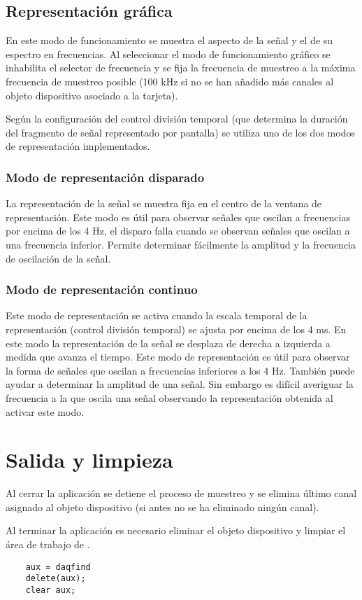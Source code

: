 \subsection{Representación gráfica}

En este modo de funcionamiento se muestra el aspecto de la señal y el de su
espectro en frecuencias. Al seleccionar el modo de funcionamiento gráfico
se inhabilita el selector de frecuencia y se fija la frecuencia de muestreo
a la máxima frecuencia de muestreo posible (100 kHz si no se han añadido
más canales al objeto dispositivo asociado a la tarjeta).

Según la configuración del control división temporal (que determina la
duración del fragmento de señal representado por pantalla) se utiliza uno
de los dos modos de representación implementados.


\subsubsection{Modo de representación disparado}

La representación de la señal se muestra fija en el centro de la ventana de
representación. Este modo es útil para observar señales que oscilan a
frecuencias por encima de los 4 Hz, el disparo falla cuando se observan
señales que oscilan a una frecuencia inferior. Permite determinar
fácilmente la amplitud y la frecuencia de oscilación de la señal.


\subsubsection{Modo de representación continuo}

Este modo de representación se activa cuando la escala temporal de la
representación (control división temporal) se ajusta por encima de los 4
ms. En este modo la representación de la señal se desplaza de derecha a
izquierda a medida que avanza el tiempo. Este modo de representación es
útil para observar la forma de señales que oscilan a frecuencias inferiores
a los 4 Hz. También puede ayudar a determinar la amplitud de una señal. Sin
embargo es difícil averiguar la frecuencia a la que oscila una señal
observando la representación obtenida al activar este modo.


\section{Salida y limpieza}

Al cerrar la aplicación se detiene el proceso de muestreo y se elimina
último canal asignado al objeto dispositivo (si antes no se ha eliminado
ningún canal).

Al terminar la aplicación es necesario eliminar el objeto dispositivo y
limpiar el área de trabajo de \matlab{}.

\begin{center}
    \begin{lstlisting}
	aux = daqfind
	delete(aux);
	clear aux;
    \end{lstlisting}
\end{center}
